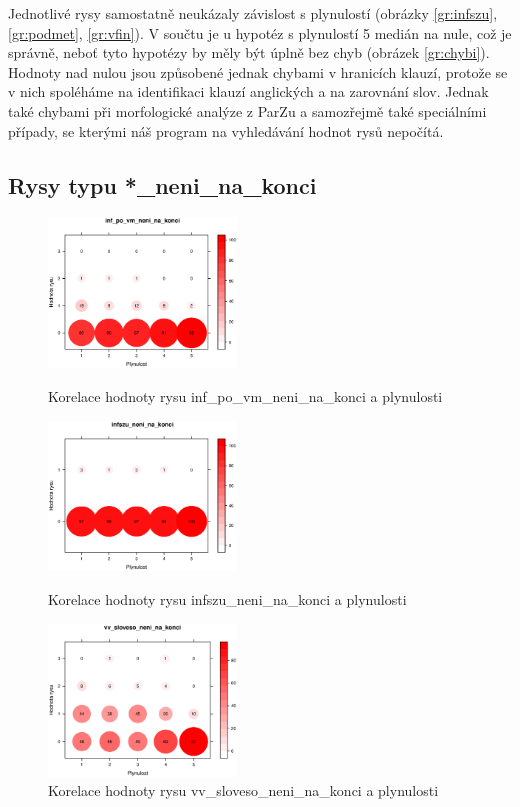 \documentclass[12pt,a4paper]{report}
\begin{document}
Jednotlivé rysy samostatně neukázaly závislost s plynulostí (obrázky \ref{gr:infszu}, \ref{gr:podmet}, \ref{gr:vfin}). V součtu je u hypotéz s plynulostí 5 medián na nule, což je správně, neboť tyto hypotézy by měly být úplně bez chyb (obrázek \ref{gr:chybi}). Hodnoty nad nulou jsou způsobené jednak chybami v hranicích klauzí, protože se v nich spoléháme na identifikaci klauzí anglických a na zarovnání slov. Jednak také chybami při morfologické analýze z ParZu a samozřejmě také speciálními případy, se kterými náš program na vyhledávání hodnot rysů nepočítá.

\pagebreak


\subsection{Rysy typu *\_neni\_na\_konci}
\begin{figure}[!htb]
  \centering\includegraphics[width=50mm]{./grafy/rysy/inf_po_vm_neni_na_konci-c.eps}
  \caption{Korelace hodnoty rysu inf\_po\_vm\_neni\_na\_konci a plynulosti}\label{gr:vm}
\endminipage\hfill
{}
  \centering\includegraphics[width=50mm]{./grafy/rysy/infszu_neni_na_konci-c.eps}
  \caption{Korelace hodnoty rysu infszu\_neni\_na\_konci a plynulosti}\label{gr:infszu_konec}
\endminipage\hfill
{}
  \centering\includegraphics[width=50mm]{./grafy/rysy/vv_sloveso_neni_na_konci-c.eps}
  \caption{Korelace hodnoty rysu vv\_sloveso\_neni\_na\_konci a plynulosti}\label{gr:vvsloveso}
\endminipage\hfill
\end{figure}
\end{document}
